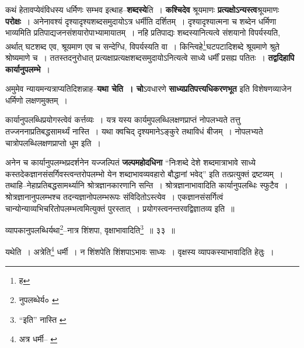 \documentclass[article,12pt,a4paper]{memoir}
\begin{document}
	  \pstart कथं हेतावप्येवंविधस्य धर्मिणः सम्भव इत्थाह--\textbf{शब्दस्ये}ति । \textbf{कश्चिदेव} श्रूयमाणः \textbf{प्रत्यक्षोऽन्यस्त्व}श्रूयमाणः \textbf{परोक्षः} । अनेनावश्यं दृश्यादृश्यशब्दसमुदायोऽत्र धर्मीति दर्शितम् । दृश्यादृश्यात्मना च शब्देन धर्मिणा भाव्यमिति प्रतिपाद्यजनसंशयारोपाभ्यामायातम् । नहि प्र\leavevmode{}तिपाद्यः शब्दस्यानित्यत्वे संशयानो विपर्यस्यति, अर्थात् घटशब्द एव, श्रूयमाण एव च सन्देग्धि, विपर्यस्यति वा । किन्त्विहे\footnote{ह}घटपटादिशब्दे श्रूयमाणे श्रुते श्रोष्यमाणे च । ततस्तदनुरोधात् प्रत्यक्षाप्रत्यक्षशब्दसमुदायोऽनित्यत्वे साध्ये धर्मीं प्रसह्य पतितः । \textbf{तद्वदिहापि कार्यानुपलम्भे} ।
	\pend
      

	  \pstart अमुमेव न्यायमन्यत्राप्यतिदिशन्नाह--\textbf{यथा चेति । चो}ऽवधारणे \textbf{साध्यप्रतिपत्त्यधिकरणभूत} इति विशेषणव्याजेन धर्मिणो लक्षणमुक्तम् ।
	\pend
      

	  \pstart कार्यानुपलब्धिप्रयोगस्त्वेवं कर्त्तव्यः । यत्र यस्य कार्यमुपलब्धिलक्षणप्राप्तं नोपलभ्यते तत्तु तज्जननाप्रतिबद्धसामर्थ्यं नास्ति । यथा क्वचिद् दृश्यमानेऽङ्कुरे तथाविधं बीजम् । नोपलभ्यते चात्रोपलब्धिलक्षणप्राप्तो धूम इति ।
	\pend
      

	  \pstart अनेन च कार्यानुपलम्भप्रदर्शनेन यज्जल्पितं \textbf{जल्पमहोदधिना} “निःशब्दे देशे शब्दमात्राभावे साध्ये कस्तदेकज्ञानसंसर्गिवस्त्वन्तरोपलम्भो येन शब्दाभावव्यवहारो बौद्धानां भवेद्” इति तत्प्रत्युक्तं द्रष्टव्यम् । तथाहि--नेहाप्रतिबद्धसामर्थ्यानि श्रोत्रज्ञानकारणानि सन्ति । श्रोत्रज्ञानाभावादिति कार्यानुपलब्धिः स्फुटैव । श्रोत्रज्ञानानुपलम्भश्च तदन्यज्ञानोपलम्भरूपः संविदितोऽस्त्येव । एकज्ञानसंसर्गित्वं चान्योन्याव्यभिचरितोपलम्भत्वमित्युक्तं पुरस्तात् । प्रयोगस्त्वनन्तरवद्विज्ञातव्य इति ॥
	\pend
      \leavevmode{}
	  \bigskip
	  \begingroup
	
	  \bigskip
	  \begingroup
	

	  \pstart व्यापकानुपलब्धिर्यथा\footnote{नुपलब्धेर्य० \cite{dp-msC}}--नात्र शिंशपा, वृक्षाभावादिति\footnote{“इति” नास्ति \cite{dp-edE}} ॥ ३३ ॥
	\pend
      
	  \endgroup
	 

	  \pstart यथेति । अत्रेति\footnote{अत्र धर्मी--\cite{dp-msA} \cite{dp-msB} \cite{dp-edP} \cite{dp-edH} \cite{dp-edE}} धर्मी । न शिंशपेति शिंशपाऽभावः साध्यः । वृक्षस्य व्यापकस्याभावादिति हेतुः ।
	\pend
       
\end{document}
